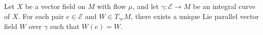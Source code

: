 Let $X$ be a vector field on $M$ with flow $\mu$, and let $\gamma: \mathcal{E} \rightarrow M$ be an integral curve of $X$. For each pair $e \in \mathcal{E}$ and $W \in T_{\gamma e} M$, there exists a unique Lie parallel vector field $W$ over $\gamma$ such that $W(e) = W$.
